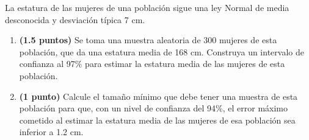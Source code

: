 
La estatura de las mujeres de una población sigue una ley Normal de media
desconocida y desviación típica 7 cm.
\begin{enumerate}[label=\alph*)]
  \item \textbf{(1.5 puntos)} Se toma una muestra aleatoria de 300 mujeres
  de esta población, que da una estatura media de 168 cm. Construya un
  intervalo de confianza al 97\% para estimar la estatura media de las
  mujeres de esta población.
  \item \textbf{(1 punto)} Calcule el tamaño mínimo que debe tener una muestra
  de esta población para que, con un nivel de confianza del 94\%, el error
  máximo cometido al estimar la estatura media de las mujeres de esa población
  sea inferior a 1.2 cm.
\end{enumerate}
